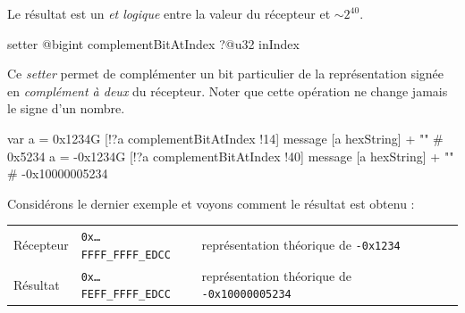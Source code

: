 Le résultat est un \emph{et logique} entre la valeur du récepteur et  $\sim2^{40}$.


\begin{galgas4box}
setter @bigint complementBitAtIndex ?@u32 inIndex
\end{galgas4box}

Ce \emph{setter} permet de complémenter un bit particulier de la représentation signée en \emph{complément à deux} du récepteur. Noter que cette opération ne change jamais le signe d'un nombre.

\begin{galgas4}
var a = 0x1234G
[!?a complementBitAtIndex !14]
message [a hexString] + "\n" # 0x5234
a = -0x1234G
[!?a complementBitAtIndex !40]
message [a hexString] + "\n" # -0x10000005234
\end{galgas4}

Considérons le dernier exemple et voyons comment le résultat est obtenu :

\begin{tabular}{llll}
Récepteur & \texttt{0x…FFFF\_FFFF\_EDCC} & représentation théorique de \texttt{-0x1234}\\
Résultat & \texttt{0x…FEFF\_FFFF\_EDCC} & représentation théorique de \texttt{-0x10000005234} \\
\end{tabular}

